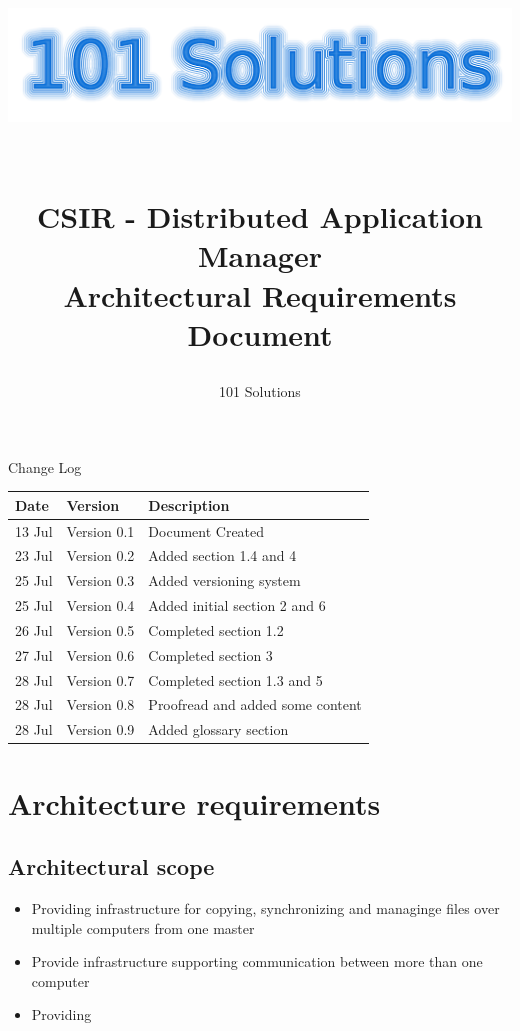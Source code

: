 \documentclass[a4paper,12pt,final]{article}
\title{
\begin{center}
  	\includegraphics[scale=0.3]{101Logo.png} 
  \end{center}
  \textbf{\\}
CSIR - Distributed Application Manager\\
Architectural Requirements Document\\
}
\author{101 Solutions}
\begin{document}
\maketitle
\thispagestyle{empty}
\newpage
\tableofcontents
\thispagestyle{empty}
\newpage
Change Log
\vspace{6pt}\newline
\begin{tabular}{|l|l|l|}
\hline
Date & Version & Description\\
\hline
13 Jul & Version 0.1 & Document Created\\
\hline
23 Jul & Version 0.2 & Added section 1.4 and 4\\
\hline
25 Jul & Version 0.3 & Added versioning system\\
\hline
25 Jul & Version 0.4 & Added initial section 2 and 6\\
\hline
26 Jul & Version 0.5 & Completed section 1.2\\
\hline
27 Jul & Version 0.6 & Completed section 3\\
\hline
28 Jul & Version 0.7 & Completed section 1.3 and 5\\
\hline
28 Jul & Version 0.8 & Proofread and added some content\\
\hline
28 Jul & Version 0.9 & Added glossary section\\
\hline
\end{tabular}

\section{Architecture requirements}
\subsection{Architectural scope}
\begin{itemize}
\item Providing infrastructure for copying, synchronizing and managinge files over multiple computers from one master
\item Provide infrastructure supporting communication between more than one computer
\item Providing 
\end{itemize}
\end{document}
